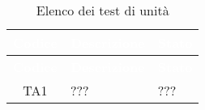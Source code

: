 {
\renewcommand{\arraystretch}{1.5}
\centering
\begin{longtable}{ c  C{8.5cm} C{3cm}}
\caption{Elenco dei test di unità}\\
\textcolor{white}{\textbf{Codice}} & \textcolor{white}{\textbf{Descrizione}} & \textcolor{white}{\textbf{Stato}}\\
\endfirsthead
{}
\textcolor{white}{\textbf{Codice}} & \textcolor{white}{\textbf{Descrizione}} & \textcolor{white}{\textbf{Stato}}\\
\endhead

TA1 & ??? & ??? \\

\end{longtable}
}